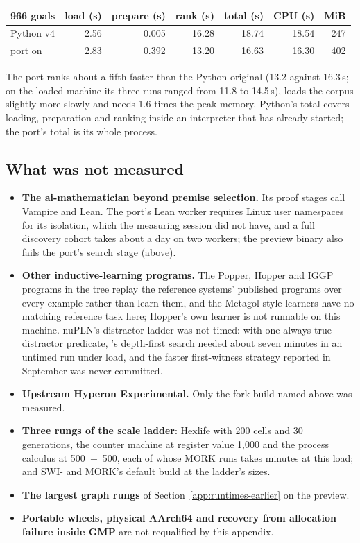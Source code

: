 \begin{center}
\small
\begin{tabular}{@{}lrrrrrr@{}}
\toprule
966 goals & load (s) & prepare (s) & rank (s) & total (s) & CPU (s) & MiB \\
\midrule
Python v4 & 2.56 & 0.005 & 16.28 & 18.74 & 18.54 & 247 \\
\PeTTa{} port on \CeTTa{} & 2.83 & 0.392 & 13.20 & 16.63 & 16.30 & 402 \\
\bottomrule
\end{tabular}
\end{center}

The port ranks about a fifth faster than the Python original (13.2 against
16.3\,s; on the loaded machine its three runs ranged from 11.8 to 14.5\,s),
loads the corpus slightly more slowly and needs 1.6 times the peak memory.
Python's total covers loading, preparation and ranking inside an interpreter
that has already started; the port's total is its whole process.

\subsection{What was not measured}
\label{app:runtimes-unmeasured}

\begin{itemize}
\item \textbf{The ai-mathematician beyond premise selection.}  Its proof stages
  call Vampire and Lean.  The port's Lean worker requires Linux user
  namespaces for its isolation, which the measuring session did not have, and a
  full discovery cohort takes about a day on two workers; the preview binary
  also fails the port's search stage (above).
\item \textbf{Other inductive-learning programs.}  The Popper, Hopper and IGGP
  programs in the tree replay the reference systems' published programs over
  every example rather than learn them, and the Metagol-style learners have no
  matching reference task here; Hopper's own learner is not runnable on this
  machine.  nuPLN's distractor ladder was not timed: with one always-true
  distractor predicate, \CeTTa{}'s depth-first search needed about seven
  minutes in an untimed run under load, and the faster first-witness strategy
  reported in September was never committed.
\item \textbf{Upstream Hyperon Experimental.}  Only the fork build named above
  was measured.
\item \textbf{Three rungs of the scale ladder}: Hexlife with 200 cells and 30
  generations, the counter machine at register value 1,000 and the process
  calculus at 500~$+$~500, each of whose MORK runs takes minutes at this load;
  and SWI-\PeTTa{} and MORK's default build at the ladder's sizes.
\item \textbf{The largest graph rungs} of Section~\ref{app:runtimes-earlier}
  on the preview.
\item \textbf{Portable wheels, physical AArch64 and recovery from allocation
  failure inside GMP} are not requalified by this appendix.
\end{itemize}

